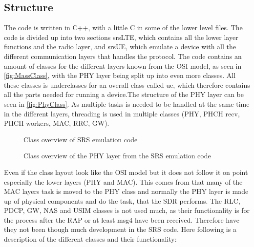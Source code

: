 \subsection{Structure}
The code is written in C++, with a little C in some of the lower level files. The code is divided up into two sections srsLTE, which contains all the lower layer functions and the radio layer, and srsUE, which emulate a device with all the different communication layers that handles the protocol. The code contains an amount of classes for the different layers known from the OSI model, as seen in \autoref{fig:MassClass}, with the PHY layer being split up into even more classes. All these classes is underclasses for an overall class called ue, which therefore contains all the parts needed for running a device.The structure of the PHY layer can be seen in \autoref{fig:PhyClass}. As multiple tasks is needed to be handled at the same time in the different layers, threading is used in multiple classes (PHY, PHCH recv, PHCH workers, MAC, RRC, GW).

\begin{figure}[H]
\centering
{}
\resizebox{0.5\textwidth}{!}{
}
\caption{Class overview of SRS emulation code}
\label{fig:MassClass}
\end{figure}

\begin{figure}[H]
\centering
{}
\resizebox{0.5\textwidth}{!}{
}
\caption{Class overview of the PHY layer from the SRS emulation code}
\label{fig:PhyClass}
\end{figure}

Even if the class layout look like the OSI model but it does not follow it on point especially the lower layers (PHY and MAC). This comes from that many of the MAC layers task is moved to the PHY class and normally the PHY layer is made up of physical components and do the task, that the SDR performs. The RLC, PDCP, GW, NAS and USIM classes is not used much, as their functionality is for the process after the RAP or at least msg4 have been received. Therefore have they not been though much development in the SRS code. Here following is a description of the different classes and their functionality:

